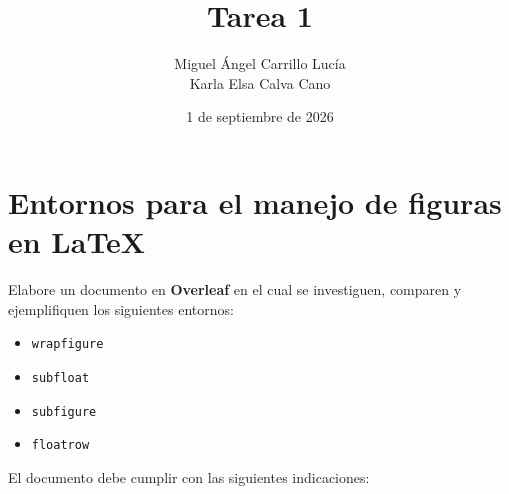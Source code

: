 \documentclass{article}
\title{Tarea 1}
\author{Miguel Ángel Carrillo Lucía \\ Karla Elsa Calva Cano}
\date{1 de septiembre de 2026}
\begin{document}
\maketitle
\vspace{-10mm}

\section*{Entornos para el manejo de figuras en \LaTeX}

Elabore un documento en \textbf{Overleaf} en el cual se investiguen, comparen y ejemplifiquen los siguientes entornos:

\begin{itemize}
    \item \texttt{wrapfigure}
    \item \texttt{subfloat}
    \item \texttt{subfigure}
    \item \texttt{floatrow}
\end{itemize}

El documento debe cumplir con las siguientes indicaciones:
\end{document}
